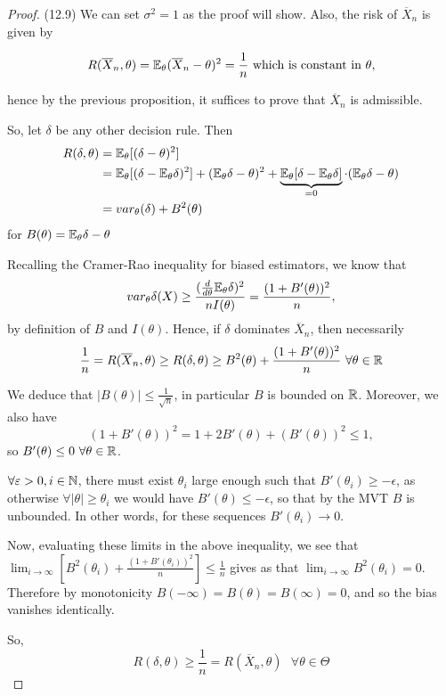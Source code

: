 \documentclass[a4paper]{article}
\begin{document}
\begin{proof}(12.9)
	We can set $\sigma^2=1$ as the proof will show. Also, the risk of $\overline{X}_n$ is given by

	\[
		R(\overline{X}_n, \theta) = \mathbb{E}_{\theta} (\overline{X}_n - \theta)^2 =\frac{1}{n} \text{ which is constant in } \theta
	,\]

	hence by the previous proposition,  it suffices to prove that $\overline{X}_n$ is admissible.

	So, let $\delta$ be any other decision rule. Then
	\begin{align*}
		R(\delta,\theta) &= \mathbb{E}_{\theta} [(\delta - \theta)^2] \\
		&= \mathbb{E}_{\theta} [(\delta - \mathbb{E}_{\theta} \delta)^2] + (\mathbb{E}_{\theta} \delta - \theta)^2 + \underbrace{\mathbb{E}_{\theta}[\delta -\mathbb{E}_{\theta}\delta ]}_{=0} \cdot (\mathbb{E}_{\theta}\delta - \theta)\\
		&= var_{\theta}(\delta) + B^2(\theta)
	\end{align*}
	for $B(\theta) = \mathbb{E}_{\theta}\delta - \theta$

	Recalling the Cramer-Rao inequality for biased estimators, we know that
	\[
	var_{\theta}\delta(X) \ge  \frac{(\frac{d}{d\theta} \mathbb{E}_{\theta}\delta)^2}{nI(\theta)} = \frac{(1+B'(\theta))^2}{n}
	,\]
	by definition of $B$ and $I(\theta)$. Hence, if  $\delta $ dominates $\overline{X}_n$, then necessarily
	\[
		\frac{1}{n} = R(\overline{X}_n, \theta) \ge R(\delta, \theta) \ge B^2(\theta) + \frac{(1+B'(\theta))^2}{n} \text{ } \forall \theta\in \mathbb{R}
	\]

	We deduce that $|B(\theta)| \le \frac{1}{\sqrt{n} }$, in particular $B$ is bounded on $\mathbb{R}$. Moreover, we also have
	 \[
		 (1+B'(\theta))^2 = 1 +2B'(\theta) + (B'(\theta))^2 \le 1 
	,\]
	so $B'(\theta) \le 0 \text{ } \forall \theta \in \mathbb{R}$.

	$\forall \varepsilon >0, i \in \mathbb{N}$, there must exist $\theta_i$ large enough such that $B'(\theta_i) \ge - \epsilon$, as otherwise $\forall |\theta| \ge \theta_i $ we would have $B'(\theta) \le - \epsilon$, so that by the MVT $B$ is unbounded. In other words, for these sequences $B'(\theta_i) \to 0$.

	Now, evaluating these limits in the above inequality, we see that $\lim_{i\to \infty}\left[ B^2(\theta_i) + \frac{(1+B'(\theta_i))^2}{n} \right] \le \frac{1}{n} $ gives as that $\lim_{i\to \infty} B^2(\theta_i) = 0$. Therefore by monotonicity $B(-\infty) = B(\theta) = B(\infty) = 0$, and so the bias vanishes identically.

	So,
	\[
		R(\delta, \theta) \ge \frac{1}{n} = R(\overline{X}_n, \theta) \text{ } \forall \theta \in \Theta
	\] 
\end{proof}
\end{document}
